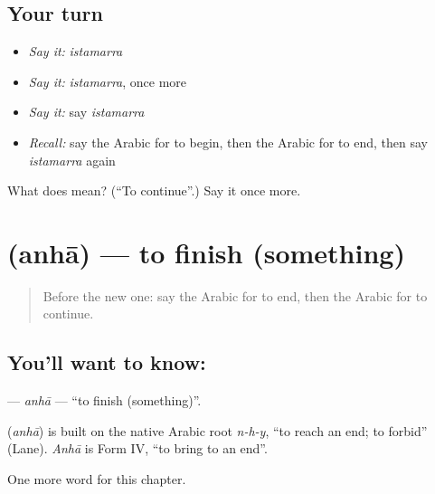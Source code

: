 \subsection*{Your turn}
\begin{itemize}
\raggedright
  \item \emph{Say it:} \emph{istamarra}
  \item \emph{Say it:} \emph{istamarra}, once more
  \item \emph{Say it:} say \emph{istamarra}
  \item \emph{Recall:} say the Arabic for to begin, then the Arabic for to end, then say \emph{istamarra} again
\end{itemize}

\begin{tcolorbox}[breakable,colback=teal!4,colframe=teal!35!black,title={Before you move on}]
What does  mean? (\textquotedblleft{}To continue\textquotedblright{}.) Say it once more.
\end{tcolorbox}
\section[\texorpdfstring{\ar{أنهى} (anhā)}{أنهى (anhā)}]{ (anhā) — to finish (something)}

\label{lesson:AR-C165-anha}



\begin{quote}
Before the new one: say the Arabic for to end, then the Arabic for to continue.
\end{quote}

\subsection*{You'll want to know: }
\textbf{} — \emph{anhā} — \textquotedblleft{}to finish (something)\textquotedblright{}.

\begin{cousinweb}
\textbf{} (\emph{anhā}) is built on the native Arabic root \emph{n-h-y}, \textquotedblleft{}to reach an end; to forbid\textquotedblright{} (Lane). \emph{Anhā} is Form IV, \textquotedblleft{}to bring to an end\textquotedblright{}.
\end{cousinweb}

\begin{grammarlens}[title={What you've built}]
One more word for this chapter.
\end{grammarlens}

